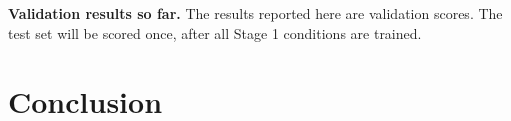 \documentclass{scrartcl}
\begin{document}
\textbf{Validation results so far.} The results reported here are validation scores. The test set will be scored once, after all Stage 1 conditions are trained.

\section{Conclusion}


\nocite{*}



\end{document}
